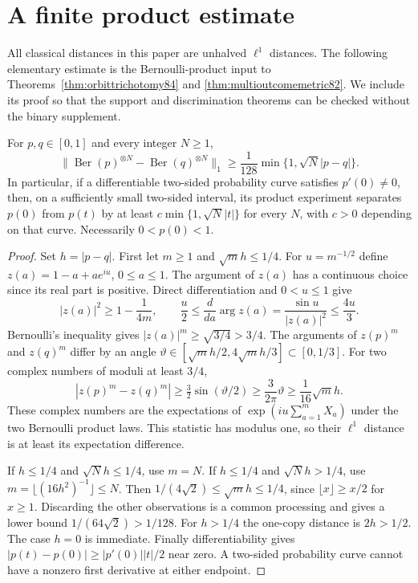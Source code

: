 \section{A finite product estimate}\label{sec:product85}
All classical distances in this paper are unhalved $\ell^1$ distances.
The following elementary estimate is the Bernoulli-product input to
Theorems~\ref{thm:orbittrichotomy84} and \ref{thm:multioutcomemetric82}.
We include its proof so that the support and discrimination theorems
can be checked without the binary supplement.

\begin{lemma}\label{lem:bernoulli85}
For $p,q\in[0,1]$ and every integer $N\ge1$,
\begin{equation}\label{eq:bernoulli85}
 \|\operatorname{Ber}(p)^{\otimes N}-
       \operatorname{Ber}(q)^{\otimes N}\|_1
 \ge \frac1{128}\min\{1,\sqrt N|p-q|\}.
\end{equation}
In particular, if a differentiable two-sided probability curve satisfies
$p'(0)\ne0$, then, on a sufficiently small two-sided interval,
its product experiment separates $p(0)$ from $p(t)$ by at least
$c\min\{1,\sqrt N|t|\}$ for every $N$, with $c>0$ depending
on that curve.  Necessarily $0<p(0)<1$.
\end{lemma}
\begin{proof}
Set $h=|p-q|$.  First let $m\ge1$ and $\sqrt m h\le1/4$.
For $u=m^{-1/2}$ define $z(a)=1-a+ae^{iu}$, $0\le a\le1$.
The argument of $z(a)$ has a continuous choice since its real part
is positive.  Direct differentiation and $0<u\le1$ give
\[
 |z(a)|^2\ge1-\frac1{4m},\qquad
 \frac u2\le\frac{d}{da}\arg z(a)
       =\frac{\sin u}{|z(a)|^2}\le\frac{4u}3.
\]
Bernoulli's inequality gives $|z(a)|^m\ge\sqrt{3/4}>3/4$.
The arguments of $z(p)^m$ and $z(q)^m$ differ by an angle
$\vartheta\in[\sqrt m h/2,4\sqrt m h/3]\subset[0,1/3]$.
For two complex numbers of moduli at least $3/4$,
\[
 |z(p)^m-z(q)^m|\ge\tfrac32\sin(\vartheta/2)
 \ge\frac{3}{2\pi}\vartheta\ge\frac1{16}\sqrt m h.
\]
These complex numbers are the expectations of
$\exp(iu\sum_{a=1}^m X_a)$ under the two Bernoulli product laws.
This statistic has modulus one, so their $\ell^1$ distance is at least
its expectation difference.

If $h\le1/4$ and $\sqrt N h\le1/4$, use $m=N$.
If $h\le1/4$ and $\sqrt N h>1/4$, use
$m=\lfloor(16h^2)^{-1}\rfloor\le N$.
Then $1/(4\sqrt2)\le\sqrt m h\le1/4$, since
$\lfloor x\rfloor\ge x/2$ for $x\ge1$.
Discarding the other observations is a common processing and gives
a lower bound $1/(64\sqrt2)>1/128$.
For $h>1/4$ the one-copy distance is $2h>1/2$.
The case $h=0$ is immediate.  Finally differentiability gives
$|p(t)-p(0)|\ge|p'(0)||t|/2$ near zero.  A two-sided probability
curve cannot have a nonzero first derivative at either endpoint.
\end{proof}
